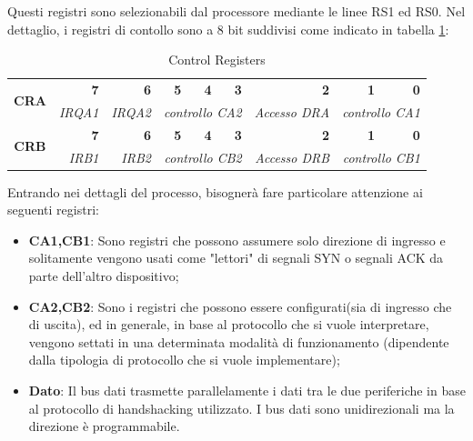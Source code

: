 Questi registri sono selezionabili dal processore mediante le linee RS1 ed RS0.
Nel dettaglio, i registri di contollo sono a 8 bit suddivisi come indicato in tabella \ref{Tab:control_registers}:

\begin{table}[!ht]
    \begin{tabular}{|c|r|r|rrr|r|rr|}
    \hline
    \multirow{2}{*}{\textbf{CRA}} & \textbf{7}     & \textbf{6}     & \multicolumn{1}{r|}{\textbf{5}} & \multicolumn{1}{r|}{\textbf{4}} & \textbf{3} & \textbf{2}           & \multicolumn{1}{r|}{\textbf{1}} & \textbf{0} \\ \cline{2-9} 
                                  & \textit{IRQA1} & \textit{IRQA2} & \multicolumn{3}{r|}{\textit{controllo CA2}}                                    & \textit{Accesso DRA} & \multicolumn{2}{r|}{\textit{controllo CA1}}  \\ \hline
    \multirow{2}{*}{\textbf{CRB}} & \textbf{7}     & \textbf{6}     & \multicolumn{1}{r|}{\textbf{5}} & \multicolumn{1}{r|}{\textbf{4}} & \textbf{3} & \textbf{2}           & \multicolumn{1}{r|}{\textbf{1}} & \textbf{0} \\ \cline{2-9} 
                                  & \textit{IRB1}  & \textit{IRB2}  & \multicolumn{3}{r|}{\textit{controllo CB2}}                                    & \textit{Accesso DRB} & \multicolumn{2}{r|}{\textit{controllo CB1}}  \\ \hline
    \end{tabular}
    \caption{Control Registers}
    \label{Tab:control_registers}
\end{table}

Entrando nei dettagli del processo, bisognerà fare particolare attenzione ai seguenti registri:
\begin{itemize}
    \item \textbf{CA1,CB1}: Sono registri che possono assumere solo direzione di ingresso e solitamente vengono usati come "lettori" di segnali SYN o segnali ACK da parte dell'altro dispositivo;
    \item \textbf{CA2,CB2}: Sono i registri che possono essere configurati(sia di ingresso che di uscita), ed in generale, in base al protocollo che si vuole interpretare, vengono settati in una determinata modalità di funzionamento (dipendente dalla tipologia di protocollo che si vuole implementare);
    \item \textbf{Dato}: Il bus dati trasmette parallelamente i dati tra le due periferiche in base al protocollo di handshacking utilizzato. I bus dati sono unidirezionali ma la direzione è programmabile. 
\end{itemize}

